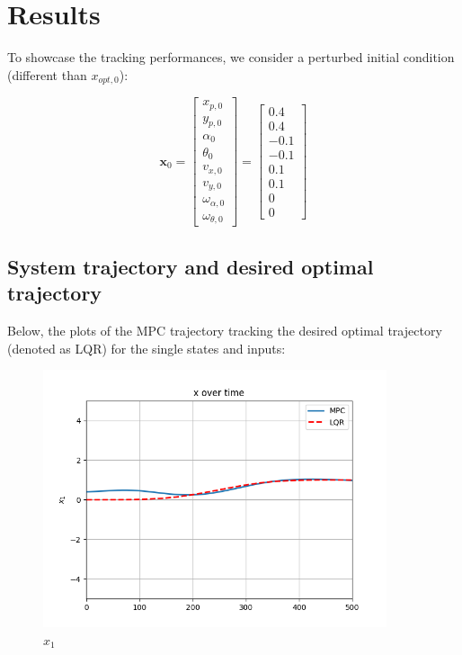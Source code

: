 \section{Results}

To showcase the tracking performances, we consider a perturbed initial condition (different than $x_{opt, 0}$): 

\[ \textbf{x}_0 = \begin{bmatrix} x_{p,0} \\ y_{p,0} \\ \alpha_0 \\ \theta_0 \\ v_{x,0} \\ v_{y,0} \\ \omega_{\alpha,0} \\ \omega_{\theta,0} \end{bmatrix} = \begin{bmatrix}   0.4 \\ 0.4 \\ -0.1 \\ -0.1 \\ 0.1 \\ 0.1 \\ 0 \\ 0 \end{bmatrix} \]


\subsection{System trajectory and desired optimal trajectory}
Below, the plots of the MPC trajectory tracking the desired optimal trajectory (denoted as LQR) for the single states and inputs: 

\begin{figure}[H]
\centering
\includegraphics[width=0.9\textwidth]{pictures/mpc1.png}
\caption{$x_1$}
\label{fig:mpc1}
\end{figure}

